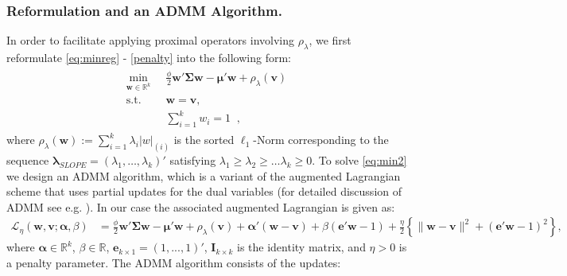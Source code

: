 \documentclass[12pt, a4paper]{article}
\newcommand{\bfw}{\boldsymbol{w} }
\newcommand{\bfmu}{\boldsymbol{\mu} }
\newcommand{\bfSigma}{\boldsymbol{\Sigma} }
\newcommand{\bfv}{\boldsymbol{v}}
\newcommand{\bfe}{\boldsymbol{e}}
\newcommand{\bfalpha}{\boldsymbol{\alpha}}
\newcommand{\bflambda}{\boldsymbol{\lambda}}
\newcommand{\R}{\mathbb{R}}
\begin{document}
\subsubsection*{Reformulation and an ADMM Algorithm.} %
In order to facilitate applying proximal operators involving
$\rho_\lambda$, we first reformulate \eqref{eq:minreg} - \eqref{penalty} into the following form:
\begin{gather}\label{eq:min2}
\begin{aligned}
\min_{\bfw\in\R^k} &\;\; \frac{\phi}{2} \bfw'\bfSigma \bfw - \bfmu'\bfw + \rho_\lambda(\bfv) \\
\text{s.t.} &\;\; \bfw=\bfv, \\
            &\;\; \sum_{i=1}^k w_i = 1 \;\;,
\end{aligned}
\end{gather}
where $\rho_\lambda(\bfw) := \sum_{i=1}^k \lambda_i |w|_{(i)}$ is the sorted $\ell_1$-Norm corresponding to the sequence $\bflambda_{SLOPE} = (\lambda_1,\dots,\lambda_k)'$ satisfying $\lambda_1 \ge \lambda_2 \ge \dots \lambda_k \ge 0$. To solve \eqref{eq:min2} we design an ADMM algorithm, which is a variant of the augmented Lagrangian scheme that uses partial updates for the dual variables (for detailed discussion of ADMM see e.g. \cite{BoyP11}). In our case the associated augmented Lagrangian is given as:
$$
\begin{aligned}
  \mathcal L_\eta (\bfw,\bfv;\bfalpha,\beta) &= \frac{\phi}{2} \bfw'\bfSigma \bfw - \bfmu' \bfw + \rho_\lambda(\bfv)
  + \bfalpha'(\bfw-\bfv) + \beta (\bfe'\bfw -1)
+ \frac{\eta}{2} \left\{ \|\bfw-\bfv\|^2 + (\bfe'\bfw - 1)^2 \right\},
\end{aligned}
$$
where $\bfalpha \in \R^k$, $\beta \in \R$, $\bfe_{k \times 1} = (1, ...,1)' $, $\boldsymbol{I}_{k \times k}$ is the identity matrix, and $\eta>0$ is a penalty parameter. The ADMM algorithm consists of the updates:\\
\end{document}
